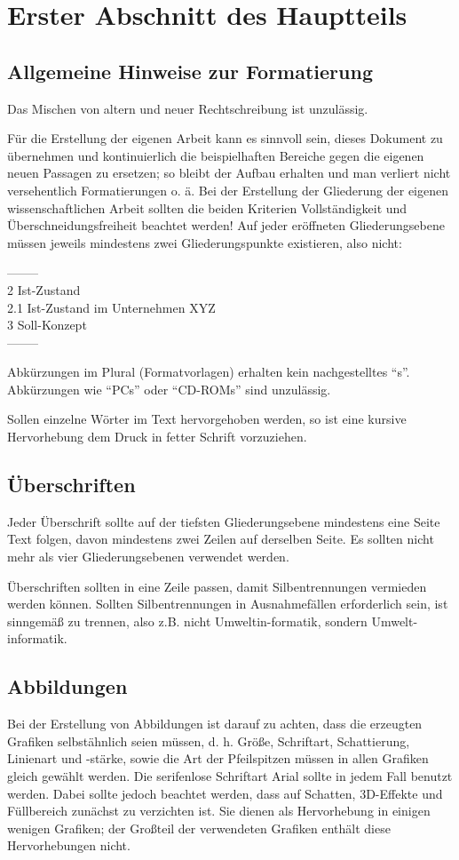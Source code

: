 \documentclass[11pt]{scrartcl}
\begin{document}
\section{Erster Abschnitt des Hauptteils}
\subsection{Allgemeine Hinweise zur Formatierung}
Das Mischen von altern und neuer Rechtschreibung ist unzulässig. 

Für die Erstellung der eigenen Arbeit kann es sinnvoll sein, dieses Dokument zu übernehmen  und kontinuierlich die beispielhaften Bereiche gegen die eigenen neuen Passagen zu ersetzen; so bleibt der Aufbau erhalten und man verliert nicht versehentlich Formatierungen o. ä. Bei der Erstellung der Gliederung der eigenen wissenschaftlichen Arbeit sollten die beiden Kriterien Vollständigkeit und Überschneidungsfreiheit beachtet werden! Auf jeder eröffneten Gliederungsebene müssen jeweils mindestens zwei Gliederungspunkte existieren, also nicht:

\noindent--------\\
2	Ist-Zustand\\
2.1	Ist-Zustand im Unternehmen XYZ\\
3	Soll-Konzept\\
--------

Abkürzungen im Plural (Formatvorlagen) erhalten kein nachgestelltes "`s"'. Abkürzungen wie "`PCs"' oder "`CD-ROMs"' sind unzulässig.

Sollen einzelne Wörter im Text hervorgehoben werden, so ist eine kursive Hervorhebung dem Druck in fetter Schrift  vorzuziehen.

\subsection{Überschriften}
Jeder Überschrift sollte auf der tiefsten Gliederungsebene mindestens eine Seite Text folgen, davon mindestens zwei Zeilen auf derselben Seite. Es sollten nicht mehr als vier Gliederungsebenen verwendet werden. 

Überschriften sollten in eine Zeile passen, damit Silbentrennungen vermieden werden können. Sollten Silbentrennungen in Ausnahmefällen erforderlich sein, ist sinngemäß zu trennen, also z.B. nicht Umweltin-formatik, sondern Umwelt-informatik.

\subsection{Abbildungen}
Bei der Erstellung von Abbildungen ist darauf zu achten, dass die erzeugten Grafiken selbstähnlich seien müssen, d. h. Größe, Schriftart, Schattierung, Linienart und -stärke, sowie die Art der Pfeilspitzen müssen in allen Grafiken gleich gewählt werden. Die serifenlose Schriftart Arial sollte in jedem Fall benutzt werden. Dabei sollte jedoch beachtet werden, dass auf Schatten, 3D-Effekte  und Füllbereich zunächst zu verzichten ist. Sie dienen als Hervorhebung in einigen wenigen Grafiken; der Großteil der verwendeten Grafiken enthält diese Hervorhebungen nicht.
\end{document}

